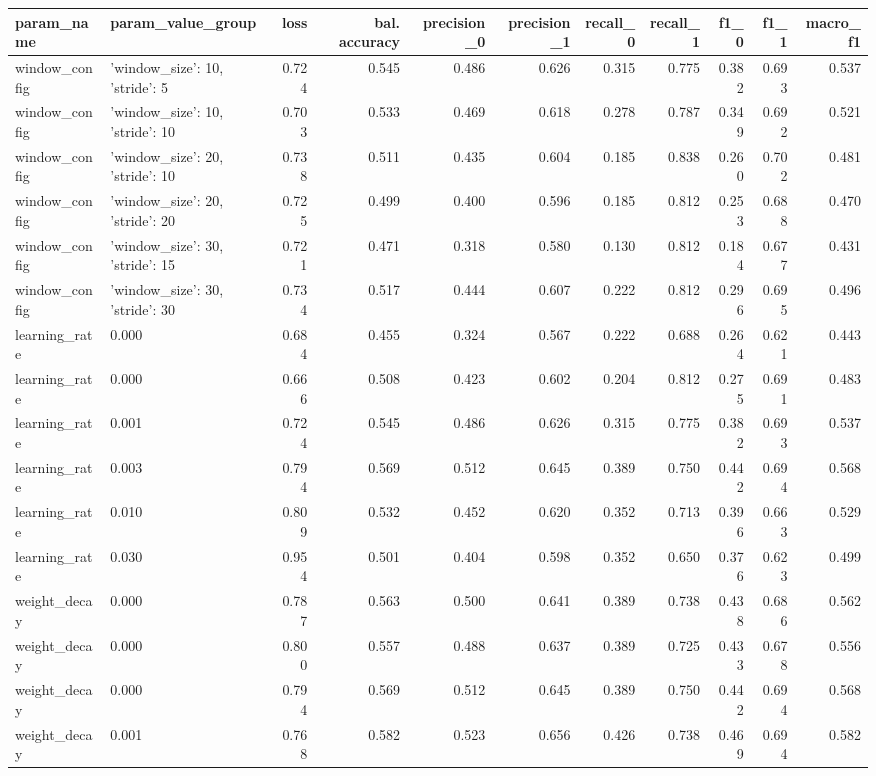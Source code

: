 \begin{tabular}{llrrrrrrrrr}
\toprule
param_name & param_value_group & loss & bal. accuracy & precision_0 & precision_1 & recall_0 & recall_1 & f1_0 & f1_1 & macro_f1 \\
\midrule
window_config & {'window_size': 10, 'stride': 5} & 0.724 & 0.545 & 0.486 & 0.626 & 0.315 & 0.775 & 0.382 & 0.693 & 0.537 \\
window_config & {'window_size': 10, 'stride': 10} & 0.703 & 0.533 & 0.469 & 0.618 & 0.278 & 0.787 & 0.349 & 0.692 & 0.521 \\
window_config & {'window_size': 20, 'stride': 10} & 0.738 & 0.511 & 0.435 & 0.604 & 0.185 & 0.838 & 0.260 & 0.702 & 0.481 \\
window_config & {'window_size': 20, 'stride': 20} & 0.725 & 0.499 & 0.400 & 0.596 & 0.185 & 0.812 & 0.253 & 0.688 & 0.470 \\
window_config & {'window_size': 30, 'stride': 15} & 0.721 & 0.471 & 0.318 & 0.580 & 0.130 & 0.812 & 0.184 & 0.677 & 0.431 \\
window_config & {'window_size': 30, 'stride': 30} & 0.734 & 0.517 & 0.444 & 0.607 & 0.222 & 0.812 & 0.296 & 0.695 & 0.496 \\
learning_rate & 0.000 & 0.684 & 0.455 & 0.324 & 0.567 & 0.222 & 0.688 & 0.264 & 0.621 & 0.443 \\
learning_rate & 0.000 & 0.666 & 0.508 & 0.423 & 0.602 & 0.204 & 0.812 & 0.275 & 0.691 & 0.483 \\
learning_rate & 0.001 & 0.724 & 0.545 & 0.486 & 0.626 & 0.315 & 0.775 & 0.382 & 0.693 & 0.537 \\
learning_rate & 0.003 & 0.794 & 0.569 & 0.512 & 0.645 & 0.389 & 0.750 & 0.442 & 0.694 & 0.568 \\
learning_rate & 0.010 & 0.809 & 0.532 & 0.452 & 0.620 & 0.352 & 0.713 & 0.396 & 0.663 & 0.529 \\
learning_rate & 0.030 & 0.954 & 0.501 & 0.404 & 0.598 & 0.352 & 0.650 & 0.376 & 0.623 & 0.499 \\
weight_decay & 0.000 & 0.787 & 0.563 & 0.500 & 0.641 & 0.389 & 0.738 & 0.438 & 0.686 & 0.562 \\
weight_decay & 0.000 & 0.800 & 0.557 & 0.488 & 0.637 & 0.389 & 0.725 & 0.433 & 0.678 & 0.556 \\
weight_decay & 0.000 & 0.794 & 0.569 & 0.512 & 0.645 & 0.389 & 0.750 & 0.442 & 0.694 & 0.568 \\
weight_decay & 0.001 & 0.768 & 0.582 & 0.523 & 0.656 & 0.426 & 0.738 & 0.469 & 0.694 & 0.582 \\

\end{tabular}
